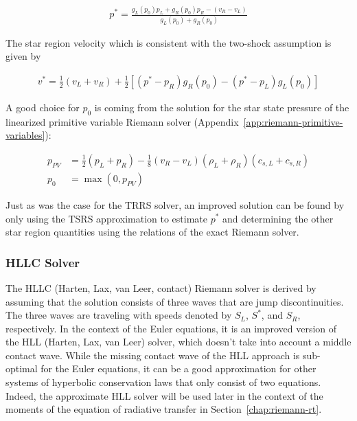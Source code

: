 \begin{align}
	p^* = \frac{g_L(p_0) p_L + g_R(p_0)p_R - (v_R - v_L)}{g_L(p_0) + g_R(p_0)} \label{eq:pstar-tsrs}
\end{align}

The star region velocity which is consistent with the two-shock assumption is given by

\begin{align}
	v^*  = \frac{1}{2} (v_L + v_R) + \frac{1}{2} \left[ (p^* - p_R) g_R(p_0) - (p^* - p_L) g_L(p_0)
\right]
\end{align}


A good choice for $p_0$ is coming from the solution for the star state pressure of the linearized
primitive variable Riemann solver (Appendix~\ref{app:riemann-primitive-variables}):

\begin{align}
	p_{PV} &= \frac{1}{2} (p_L + p_R) - \frac{1}{8} (v_R - v_L)(\rho_L + \rho_R)(c_{s,L} +
c_{s,R})\\
	p_0 &= \max(0, p_{PV})
\end{align}

Just as was the case for the TRRS solver, an improved solution can be found by only using the TSRS
approximation to estimate $p^*$ and determining the other star region quantities using the
relations of the exact Riemann solver.







\subsubsection{HLLC Solver}\label{chap:riemann-hllc}

The HLLC (Harten, Lax, van Leer, contact) Riemann solver is derived by assuming that the solution
consists of three waves that are jump discontinuities. The three waves are traveling with speeds
denoted by $S_L$, $S^*$, and $S_R$, respectively. In the context of the Euler equations, it is an
improved version of the HLL (Harten, Lax, van Leer) solver, which doesn't take into account a middle
contact wave. While the missing contact wave of the HLL approach is sub-optimal for the Euler
equations, it can be a good approximation for other systems of hyperbolic conservation laws that
only consist of two equations. Indeed, the approximate HLL solver will be used later in the context
of the moments of the equation of radiative transfer in Section~\ref{chap:riemann-rt}.

